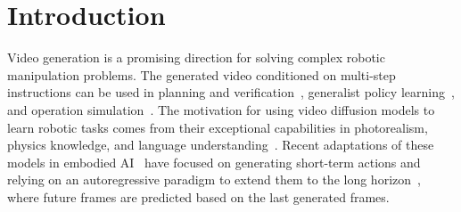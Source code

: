 \documentclass[letterpaper, 10 pt, conference]{ieeeconf}  %
\begin{document}


\section{Introduction}

Video generation is a promising direction for solving complex robotic manipulation problems. The generated video conditioned on multi-step instructions can be used in planning and verification~\cite{vlp,thisnthat}, generalist policy learning~\cite{unipi,gr2}, and operation simulation~\cite{unisim}. The motivation for using video diffusion models to learn robotic tasks comes from their exceptional capabilities in photorealism, physics knowledge, and language understanding~\cite{opensora, cogvideo}. Recent adaptations of these models in embodied AI~\cite{unisim, unipi, avdc} have focused on generating short-term actions and relying on an autoregressive paradigm to extend them to the long horizon~\cite{opensora,streamingt2v,genlvideo,vdt, vlp}, where future frames are predicted based on the last generated frames. 
\end{document}

